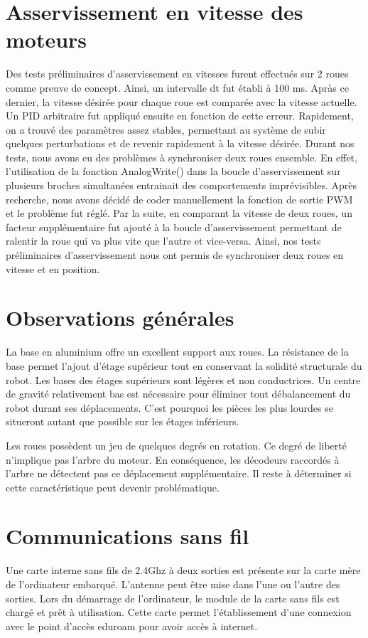 \section{Asservissement en vitesse des moteurs}

Des tests préliminaires d'asservissement en vitesses furent effectués sur 2 roues comme preuve de concept. Ainsi, un intervalle dt fut établi à 100 ms.
Apràs ce dernier, la vitesse désirée pour chaque roue est comparée avec la vitesse actuelle. Un PID arbitraire fut appliqué ensuite en fonction de cette erreur.
Rapidement, on a trouvé des paramètres assez stables, permettant au système de subir quelques perturbations et de revenir rapidement à la vitesse désirée.
Durant nos tests, nous avons eu des problèmes à synchroniser deux roues ensemble. En effet, l'utilisation de la fonction AnalogWrite() dans la boucle d'asservissement
sur plusieurs broches simultanées entrainait des comportements imprévisibles. Après recherche, nous avons décidé de coder manuellement la fonction de sortie PWM et le
problème fut réglé. Par la suite, en comparant la vitesse de deux roues, un facteur supplémentaire fut ajouté à la boucle d'asservissement permettant de ralentir la roue
qui va plus vite que l'autre et vice-versa. Ainsi, nos tests préliminaires d'asservissement nous ont permis de synchroniser deux roues en vitesse et en position.

\section{Observations générales}
  La base en aluminium offre un excellent support aux roues. La résistance de la base permet l'ajout d'étage supérieur tout en conservant la solidité
  structurale du robot. Les bases des étages supérieurs sont légères et non conductrices. Un centre de gravité relativement bas est nécessaire pour éliminer
  tout débalancement du robot durant ses déplacements. C'est pourquoi les pièces les plus lourdes se situeront autant que possible sur les étages inférieurs.

Les roues possèdent un jeu de quelques degrés en rotation. Ce degré de liberté n'implique pas l'arbre du moteur. En conséquence, les décodeurs raccordés
à l'arbre ne détectent pas ce déplacement supplémentaire. Il reste à déterminer si cette caractéristique peut devenir problématique.

\section{Communications sans fil}
  Une carte interne sans fils de 2.4Ghz à deux sorties est présente sur la carte mère de l'ordinateur embarqué. L'antenne peut être mise dans l'une ou l'autre des sorties.
   Lors du démarrage de l'ordinateur, le module de la carte sans fils est chargé et prêt à utilisation. Cette carte permet l'établissement d'une connexion avec le point d'accès
   eduroam pour avoir accès à internet.

